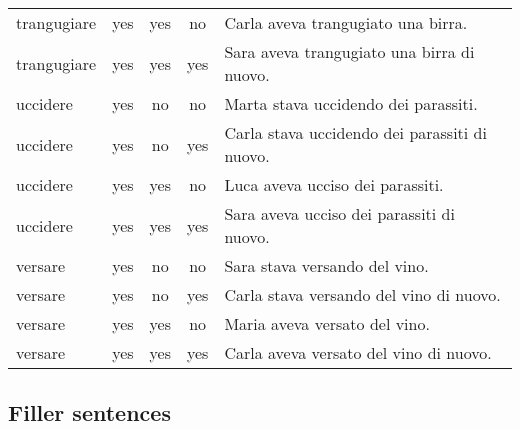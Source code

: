 \begin{longtable}{l|ccc|p{5cm}}
trangugiare    & yes  & yes        & no        & Carla aveva trangugiato una birra.                  \\
trangugiare    & yes  & yes        & yes       & Sara aveva trangugiato una birra di nuovo.          \\
uccidere       & yes  & no         & no        & Marta stava uccidendo dei parassiti.                \\
uccidere       & yes  & no         & yes       & Carla stava uccidendo dei parassiti di nuovo.       \\
uccidere       & yes  & yes        & no        & Luca aveva ucciso dei parassiti.                    \\
uccidere       & yes  & yes        & yes       & Sara aveva ucciso dei parassiti di nuovo.           \\
versare        & yes  & no         & no        & Sara stava versando del vino.                       \\
versare        & yes  & no         & yes       & Carla stava versando del vino di nuovo.             \\
versare        & yes  & yes        & no        & Maria aveva versato del vino.                       \\
versare        & yes  & yes        & yes       & Carla aveva versato del vino di nuovo.             
\end{longtable}

\subsection{Filler sentences}

